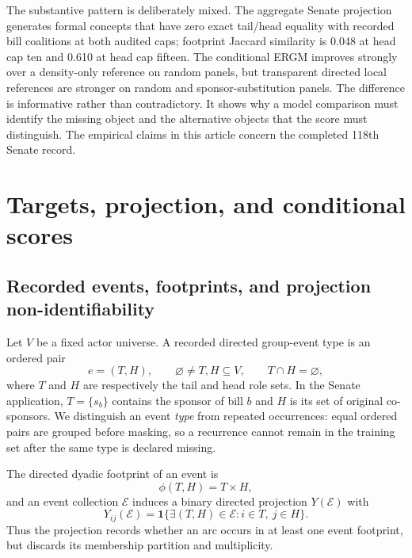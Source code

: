 \documentclass{nws}
\begin{document}
The substantive pattern is deliberately mixed. The aggregate Senate projection generates formal concepts that have zero exact tail/head equality with recorded bill coalitions at both audited caps; footprint Jaccard similarity is 0.048 at head cap ten and 0.610 at head cap fifteen. The conditional ERGM improves strongly over a density-only reference on random panels, but transparent directed local references are stronger on random and sponsor-substitution panels. The difference is informative rather than contradictory. It shows why a model comparison must identify the missing object and the alternative objects that the score must distinguish. The empirical claims in this article concern the completed 118th Senate record.

\section{Targets, projection, and conditional scores}\label{sec:targets}

\subsection{Recorded events, footprints, and projection non-identifiability}

Let $V$ be a fixed actor universe. A recorded directed group-event type is an ordered pair
\begin{equation}
 e=(T,H), \qquad \varnothing\neq T,H\subseteq V, \qquad T\cap H=\varnothing,
 \label{eq:event}
\end{equation}
where $T$ and $H$ are respectively the tail and head role sets. In the Senate application, $T=\{s_b\}$ contains the sponsor of bill $b$ and $H$ is its set of original co-sponsors. We distinguish an event \emph{type} from repeated occurrences: equal ordered pairs are grouped before masking, so a recurrence cannot remain in the training set after the same type is declared missing.

The directed dyadic footprint of an event is
\begin{equation}
 \phi(T,H)=T\times H,
 \label{eq:footprint}
\end{equation}
and an event collection $\mathcal{E}$ induces a binary directed projection $Y(\mathcal{E})$ with
\begin{equation}
 Y_{ij}(\mathcal{E})=\mathbf{1}\{\exists (T,H)\in\mathcal{E}: i\in T,\ j\in H\}.
 \label{eq:projection}
\end{equation}
Thus the projection records whether an arc occurs in at least one event footprint, but discards its membership partition and multiplicity.
\end{document}
